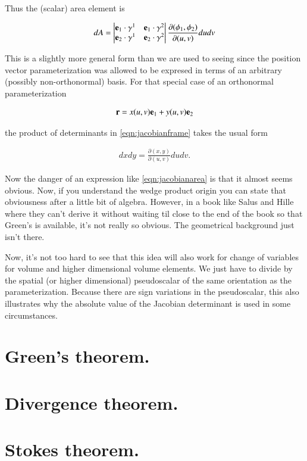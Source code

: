\documentclass{article}
\newcommand{\PD}[2]{\frac{\partial {#2}}{\partial {#1}}}
\begin{document}
Thus the (scalar) area element is

\begin{align}\label{eqn:jacobianframe}
dA =
\begin{vmatrix}
\Be_1 \cdot \gamma^{1} & \Be_1 \cdot \gamma^{2} \\
\Be_2 \cdot \gamma^{1} & \Be_2 \cdot \gamma^{2}
\end{vmatrix}
\PD{(u,v)}{(\phi_1,\phi_2)} du dv
\end{align}

This is a slightly more general form than we are used to seeing since the position vector parameterization was allowed to be expresed in terms
of an arbitrary (possibly non-orthonormal) basis.  For that special case of an orthonormal parameterization

\begin{align*}
\mathbf{r} = x(u,v) \mathbf{e}_1 + y(u,v) \mathbf{e}_2
\end{align*}

the product of determinants in \ref{eqn:jacobianframe} takes the usual form

\begin{align}\label{eqn:jacobianarea}
dx dy = \PD{(u,v)}{(x,y)} du dv.
\end{align}

Now the danger of an expression like \ref{eqn:jacobianarea} is that it almost
seems obvious.  Now, if you understand the wedge product origin you can state
that obviousness after a little bit of algebra.  However, in a book like Salus and Hille where
they can't derive it without waiting til close to the end of the book so that Green's is
available, it's not really so obvious.  The geometrical background just isn't there.

Now, it's not too hard to see that this idea will also work for change of variables for volume and higher
dimensional volume elements.  We just have to divide by the spatial (or higher dimensional) pseudoscalar of the
same orientation as the parameterization.  Because there are sign variations in the pseudoscalar, this also
illustrates why the absolute value of the Jacobian determinant is used in some circumstances.

\section{ Green's theorem. }

\section{ Divergence theorem. }

\section{ Stokes theorem. }
\end{document}

